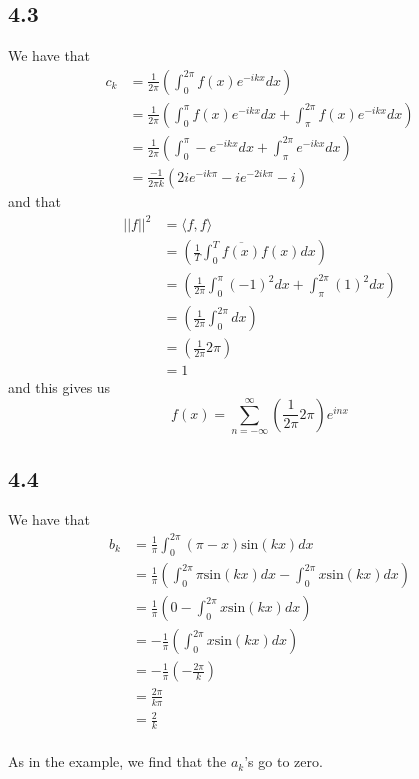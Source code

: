 \documentclass[letterpaper,12pt]{article}
\theoremstyle{definition}
\begin{document}
\subsection*{4.3}
We have that
\begin{align*}
    c_k &= \frac{1}{2\pi} \left( \int^{2\pi}_{0} f(x)e^{-ikx}  dx \right)\\
    &= \frac{1}{2\pi} \left( \int^{\pi}_{0} f(x)e^{-ikx}  dx + \int^{2\pi}_{\pi} f(x)e^{-ikx}  dx  \right)\\
    &= \frac{1}{2\pi} \left( \int^{\pi}_{0} -e^{-ikx}  dx + \int^{2\pi}_{\pi} e^{-ikx}  dx  \right)\\
    &= \frac{-1}{2 \pi k} (2ie^{-ik \pi} - ie^{-2ik \pi} - i)
\end{align*}
and that
\begin{align*}
    ||f||^2 &= \langle f, f \rangle \\
    &= \left( \frac{1}{T} \int^{T}_{0} \overline {f(x)} f(x) dx \right)  \\
    &= \left( \frac{1}{2 \pi} \int^{\pi}_{0} (-1)^2 dx + \int^{2\pi}_{\pi} (1)^2 dx\right)  \\
    &= \left( \frac{1}{2 \pi} \int^{2\pi}_{0}dx\right)  \\
    &= \left( \frac{1}{2 \pi} 2\pi\right)  \\
    &= 1 
\end{align*}
and this gives us 
\[f(x) = \sum^{\infty}_{n=-\infty}  \left( \frac{1}{2 \pi} 2\pi\right)   e^{inx}\]

\subsection*{4.4}
We have that
\begin{align*}
b_k &= \frac{1}{\pi} \int^{2\pi}_{0} (\pi - x) \text{sin}(kx) dx\\
&= \frac{1}{\pi} \left(  \int^{2\pi}_{0} \pi \text{sin}(kx) dx - \int^{2\pi}_{0} x \text{sin}(kx) dx\right)\\
&= \frac{1}{\pi} \left(  0 - \int^{2\pi}_{0} x \text{sin}(kx) dx\right)\\
&= -\frac{1}{\pi} \left(  \int^{2\pi}_{0} x \text{sin}(kx) dx\right)\\
&= - \frac{1}{\pi} \left(  -\frac{2\pi}{k}\right)\\
&=  \frac{2\pi}{k\pi} \\
&=  \frac{2}{k} \\
\end{align*}

As in the example, we find that the $a_k$'s go to zero.
\end{document}
